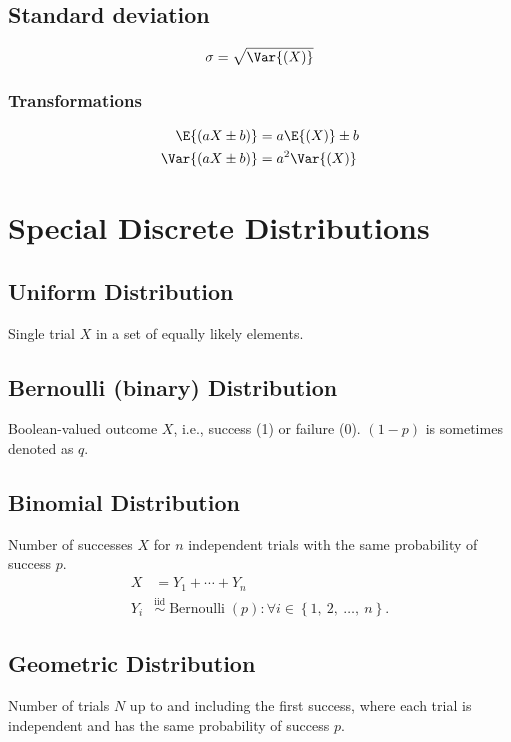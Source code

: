 \documentclass{article}
\begin{document}
\begin{multicols}{3}
    \subsection{Standard deviation}
    \begin{equation*}
        \sigma = \sqrt{\Var{\left( X \right)}}
    \end{equation*}
    \subsubsection{Transformations}
    \begin{align*}
        \E{\left( aX \pm b \right)}   & = a\E{\left( X \right)} \pm b \\
        \Var{\left( aX \pm b \right)} & = a^2\Var{\left( X \right)}
    \end{align*}
    \section{Special Discrete Distributions}
    \subsection{Uniform Distribution}
    Single trial \(X\) in a set of equally likely elements.
    \subsection{Bernoulli (binary) Distribution}
    Boolean-valued outcome \(X\), i.e., success (1) or failure (0).
    \(\left( 1 - p \right)\) is sometimes denoted as \(q\).
    \subsection{Binomial Distribution}
    Number of successes \(X\) for \(n\) independent trials with the same probability of success \(p\).
    \begin{align*}
        X   & = Y_1 + \cdots + Y_n                                                                                                           \\
        Y_i & \overset{\mathrm{iid}}{\sim} \operatorname{Bernoulli}{\left( p \right)} : \forall i \in \left\{ 1,\: 2,\: \dots,\: n \right\}.
    \end{align*}
    \subsection{Geometric Distribution}
    Number of trials \(N\) up to and including the first success, where each trial is independent and has the same probability of success \(p\).

\end{multicols}
\end{document}
